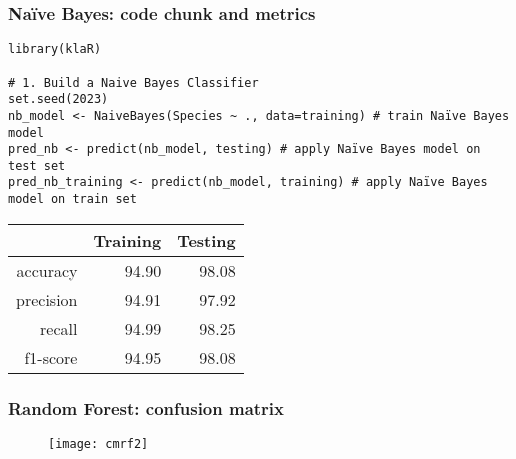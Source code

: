 \documentclass[border=5mm, convert, usenames, dvipsnames,beamer]{standalone}
\begin{document}
\begin{frame}[ fragile]{}
\frametitle{Naïve Bayes: code chunk and metrics}

\vspace{20}
\noindent


\begin{lstlisting}[style=R]
library(klaR) 

# 1. Build a Naive Bayes Classifier
set.seed(2023)
nb_model <- NaiveBayes(Species ~ ., data=training) # train Naïve Bayes model
pred_nb <- predict(nb_model, testing) # apply Naïve Bayes model on test set
pred_nb_training <- predict(nb_model, training) # apply Naïve Bayes model on train set
\end{lstlisting}


\begin{table}[ht]
\centering
\begin{tabular}{rrr}
  \hline
 & Training & Testing \\ 
  \hline
accuracy & 94.90 & 98.08 \\ 
  precision & 94.91 & 97.92 \\ 
  recall & 94.99 & 98.25 \\ 
  f1-score & 94.95 & 98.08 \\ 
   \hline
\end{tabular}
\end{table}






\end{frame}







\begin{frame}[ fragile]{}
\frametitle{Random Forest: confusion matrix}

\vspace{40}
\noindent

\vspace{-5mm}
\begin{figure}[h!]
\begin{center}
\texttt{[image: cmrf2]}
\end{center}
\end{figure}






\end{frame}
\end{document}
